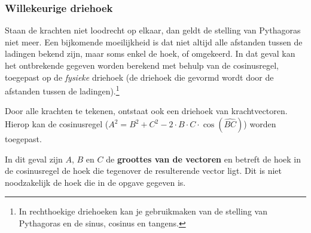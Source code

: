 \documentclass{ximera}
\begin{document}
\subsubsection{Willekeurige driehoek}
Staan de krachten niet loodrecht op elkaar, dan geldt de stelling van Pythagoras niet meer. Een bijkomende moeilijkheid is dat niet altijd alle afstanden tussen de ladingen bekend zijn, maar soms enkel de hoek, of omgekeerd. In dat geval kan het ontbrekende gegeven worden berekend met behulp van de cosinusregel, toegepast op de \textsl{fysieke} driehoek (de driehoek die gevormd wordt door de afstanden tussen de ladingen).\footnote{In rechthoekige driehoeken kan je gebruikmaken van de stelling van Pythagoras en de sinus, cosinus en tangens.}

Door alle krachten te tekenen, ontstaat ook een driehoek van krachtvectoren. Hierop kan de cosinusregel ($A^{2} = B^{2} + C^{2} - 2 \cdot B \cdot C \cdot \cos(\widehat{BC})$) worden toegepast.

\begin{remark}[title={Let op bij de cosinusregel}]
In dit geval zijn $A$, $B$ en $C$ de \textbf{groottes van de vectoren} en betreft de hoek in de cosinusregel de hoek die tegenover de resulterende vector ligt. Dit is niet noodzakelijk de hoek die in de opgave gegeven is.
\end{remark}
\end{document}
